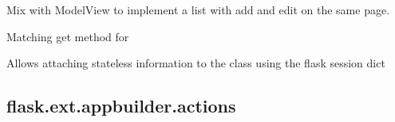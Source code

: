 \documentclass[letterpaper,10pt,english]{sphinxmanual}
\begin{document}
\begin{fulllineitems}
\label{api:flask.ext.appbuilder.views.CompactCRUDMixin}
Mix with ModelView to implement a list with add and edit on the same page.

\begin{fulllineitems}
\label{api:flask.ext.appbuilder.views.CompactCRUDMixin.get_key}
Matching get method for 

\end{fulllineitems}


\begin{fulllineitems}
\label{api:flask.ext.appbuilder.views.CompactCRUDMixin.set_key}
Allows attaching stateless information to the class using the
flask session dict

\end{fulllineitems}


\end{fulllineitems}



\subsection{flask.ext.appbuilder.actions}
\label{api:flask-ext-appbuilder-actions}\label{api:module-flask.ext.appbuilder.actions}
\end{document}
